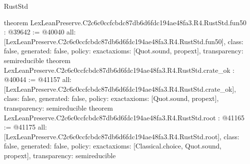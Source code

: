 \begin{lexlean}{RustStd}
\begin{coremodule}
{}
theorem LexLeanPreserve.C2c6c0ccfcbdc87db6d6fdc194ae48fa3.R4.RustStd.fun50 : @39642 := @40040 {
  all: [LexLeanPreserve.C2c6c0ccfcbdc87db6d6fdc194ae48fa3.R4.RustStd.fun50],
  class: false,
  generated: false,
  policy: exact{axioms: [Quot.sound, propext]},
  transparency: semireducible
}
theorem LexLeanPreserve.C2c6c0ccfcbdc87db6d6fdc194ae48fa3.R4.RustStd.crate_ok : @40044 := @41157 {
  all: [LexLeanPreserve.C2c6c0ccfcbdc87db6d6fdc194ae48fa3.R4.RustStd.crate_ok],
  class: false,
  generated: false,
  policy: exact{axioms: [Quot.sound, propext]},
  transparency: semireducible
}
theorem LexLeanPreserve.C2c6c0ccfcbdc87db6d6fdc194ae48fa3.R4.RustStd.root : @41165 := @41175 {
  all: [LexLeanPreserve.C2c6c0ccfcbdc87db6d6fdc194ae48fa3.R4.RustStd.root],
  class: false,
  generated: false,
  policy: exact{axioms: [Classical.choice, Quot.sound, propext]},
  transparency: semireducible
}


\end{coremodule}
\end{lexlean}
